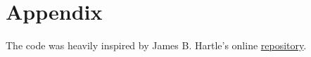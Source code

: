 \documentclass[%
 reprint,
 amsmath,amssymb
 aps,
]{revtex4}
\theoremstyle{remark}
\begin{document}



\newpage
\section{Appendix}
The code was heavily inspired by James B. Hartle's online \href{ @misc{mathematica, url={http://web.physics.ucsb.edu/~gravitybook/mathematica.html}, journal={Mathematica}} }{repository}. 

\end{document}
